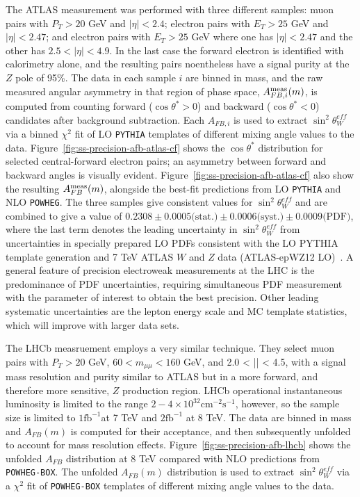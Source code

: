The ATLAS measurement was performed with three different samples: muon
pairs with $P_T > 20$ GeV and $|\eta| < 2.4$; electron pairs with $E_T
> 25$ GeV and $|\eta| < 2.47$; and electron pairs with $E_T > 25$ GeV
where one has $|\eta| < 2.47$ and the other has $2.5 < |\eta| < 4.9$.
In the last case the forward electron is identified with calorimetry
alone, and the resulting pairs noentheless have a signal purity at the
$Z$ pole of 95\%.  The data in each sample $i$ are binned in mass, and
the raw measured angular asymmetry in that region of phase space,
$A^{\rm meas}_{FB, i}(m)$, is computed from counting forward
($\cos\theta^* > 0$) and backward ($\cos\theta^* < 0$) candidates
after background subtraction.  Each $A_{FB,i}$ is used to extract
$\sin^2\theta^{eff}_{W}$ via a binned $\chi^2$ fit of
LO \texttt{PYTHIA} templates of different mixing angle values to the
data.  Figure~\ref{fig:ss-precision-afb-atlas-cf} shows the
$\cos\theta^*$ distribution for selected central-forward electron
pairs; an asymmetry between forward and backward angles is visually
evident.  Figure~\ref{fig:ss-precision-afb-atlas-cf} also show the
resulting $A^{\rm meas}_{FB}(m)$, alongside the best-fit predictions
from LO \texttt{PYTHIA} and NLO \texttt{POWHEG}.  The three samples
give consistent values for $\sin^2\theta^{eff}_{W}$ and are combined
to give a value of $0.2308 \pm 0.0005\textrm{(stat.)} \pm
0.0006\textrm{(syst.)} \pm 0.0009\textrm{(PDF)}$, where the last term
denotes the leading uncertainty in $\sin^2\theta^{eff}_{W}$ from
uncertainties in specially prepared LO PDFs consistent with the LO
PYTHIA template generation and 7 TeV ATLAS $W$ and $Z$ data
(ATLAS-epWZ12 LO)~\cite{Aad:2011dm}.  A general feature of precision
electroweak measurements at the LHC is the predominance of PDF
uncertainties, requiring simultaneous PDF measurement with the
parameter of interest to obtain the best precision.  Other leading
systematic uncertainties are the lepton energy scale and MC template
statistics, which will improve with larger data sets.

The LHCb measruement employs a very similar technique.  They select
muon pairs with $P_T > 20$ GeV, $60 < m_{\mu\mu} < 160$ GeV, and 2.0 <
|\eta| < 4.5, with a signal mass resolution and purity similar to
ATLAS but in a more forward, and therefore more sensitive, $Z$
production region.  LHCb operational instantaneous luminosity is
limited to the range $2-4\times
10^{32}\textrm{cm}^{-2}\textrm{s}^{-1}$, however, so the sample size
is limited to $1 \textrm{fb}^{-1}$at 7 TeV and $2 \textrm{fb}^{-1}$ at
8 TeV.  The data are binned in mass and $A_{FB}(m)$ is computed for
their acceptance, and then subsequently unfolded to account for mass
resolution effects. Figure~\ref{fig:ss-precision-afb-lhcb} shows the
unfolded $A_{FB}$ distribution at 8 TeV compared with NLO predictions
from \texttt{POWHEG-BOX}.  The unfolded $A_{FB}(m)$ distribution is
used to extract $\sin^2\theta^{eff}_{W}$ via a $\chi^2$ fit
of \texttt{POWHEG-BOX} templates of different mixing angle values to
the data.  


